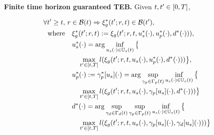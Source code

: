\begin{prop}
  \label{prop:nonconv}
  \textbf{Finite time horizon guaranteed TEB.}
  Given $t, t' \in [0, T]$,
  
  \begin{subequations} \label{eq:fin_thor_prop}
      \begin{align}
      \forall \tvar' \ge \tvar, &~ \rstate \in \TEB(\tvar) \Rightarrow \rtraj^*(\tvar'; \rstate, \tvar) \in \TEB(\tvar'), \label{eq:fin_thor_prop:statement}\\
      \text{where} &\quad \rtraj^*(\tvar'; \rstate, \tvar) := \rtraj(\tvar'; \rstate, \tvar, \tctrl^*(\cdot), \pctrl^*(\cdot), \dstb^*(\cdot))), \label{eq:fin_thor_prop:here} \\
      &\quad
      \begin{aligned}
      &\tctrl^*(\cdot) = \arg \inf_{\tctrl(\cdot)\in\tcfset(t)}\big\{\\
      & \quad \max_{\tvar' \in [\tvar, \thor]} \errfunc(\rtraj(\tvar'; \rstate, \tvar, \tctrl(\cdot), \pctrl^*(\cdot), \dstb^*(\cdot))) \big\}, \label{eq:fin_thor_prop:ctrl}\\
      \end{aligned} \\
      &\quad
      \begin{aligned}
      & \pctrl^*(\cdot) := \gamma_\pstate^*[\tctrl](\cdot) = \arg \sup_{\gamma_{\pstate} \in \Gamma_\pstate(t)} \inf_{\tctrl(\cdot) \in \tcfset(\tvar)} \big\{ \\
      & \quad \max_{\tvar' \in [\tvar, \thor]} \errfunc(\rtraj(\tvar'; \rstate, \tvar, \tctrl(\cdot), \gamma_\pstate[\tctrl](\cdot), \dstb^*(\cdot))) \big\} \\
      \end{aligned} \\
      &\quad
      \begin{aligned}
      & \dstb^*(\cdot) = \arg \sup_{\gamma_{\dstb} \in \Gamma_\dstb(t)} \sup_{\gamma_{\pstate} \in \Gamma_\pstate(t)} \inf_{\tctrl(\cdot) \in \tcfset(t)} \big\{\\
      & \quad \max_{\tvar' \in [\tvar, \thor]} \errfunc(\rtraj(\tvar'; \rstate, \tvar, \tctrl(\cdot), \gamma_\pstate[\tctrl](\cdot), \gamma_\dstb[\tctrl](\cdot))) \big\}
      \end{aligned} \label{eq:fin_thor_prop:there}
      \end{align}
  \end{subequations}

\end{prop}

